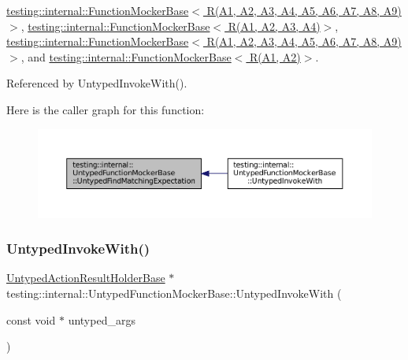 \hyperlink{classtesting_1_1internal_1_1FunctionMockerBase_aa200995eb89574f8042ba6897d6cb98f}{testing\+::internal\+::\+Function\+Mocker\+Base$<$ R(\+A1, A2, A3, A4, A5, A6, A7, A8, A9)$>$}, \hyperlink{classtesting_1_1internal_1_1FunctionMockerBase_aa200995eb89574f8042ba6897d6cb98f}{testing\+::internal\+::\+Function\+Mocker\+Base$<$ R(\+A1, A2, A3, A4)$>$}, \hyperlink{classtesting_1_1internal_1_1FunctionMockerBase_aa200995eb89574f8042ba6897d6cb98f}{testing\+::internal\+::\+Function\+Mocker\+Base$<$ R(\+A1, A2, A3, A4, A5, A6, A7, A8, A9) $>$}, and \hyperlink{classtesting_1_1internal_1_1FunctionMockerBase_aa200995eb89574f8042ba6897d6cb98f}{testing\+::internal\+::\+Function\+Mocker\+Base$<$ R(\+A1, A2)$>$}.



Referenced by Untyped\+Invoke\+With().

Here is the caller graph for this function\+:
\nopagebreak
\begin{figure}[H]
\begin{center}
\leavevmode
\includegraphics[width=350pt]{classtesting_1_1internal_1_1UntypedFunctionMockerBase_a38714b44836c937fe95524f8d7063d04_icgraph}
\end{center}
\end{figure}
\mbox{\label{classtesting_1_1internal_1_1UntypedFunctionMockerBase_adaec41c0ba8a07c2415f6c8efa0ca54f}} 
\subsubsection{\texorpdfstring{Untyped\+Invoke\+With()}{UntypedInvokeWith()}}
{\footnotesize\ttfamily \hyperlink{classtesting_1_1internal_1_1UntypedActionResultHolderBase}{Untyped\+Action\+Result\+Holder\+Base} $\ast$ testing\+::internal\+::\+Untyped\+Function\+Mocker\+Base\+::\+Untyped\+Invoke\+With (\begin{DoxyParamCaption}\item[{const void $\ast$}]{untyped\+\_\+args }\end{DoxyParamCaption})}



